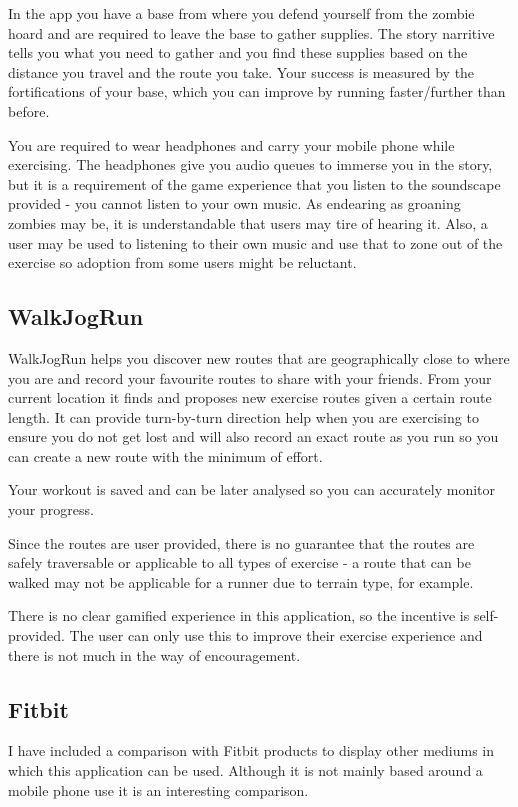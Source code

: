 In the app you have a base from where you defend yourself from the
zombie hoard and are required to leave the base to gather
supplies. The story narritive tells you what you need to gather and
you find these supplies based on the distance you travel and the route
you take. Your success is measured by the fortifications of your base,
which you can improve by running faster/further than before.

You are required to wear headphones and carry your mobile phone while
exercising. The headphones give you audio queues to immerse you in the
story, but it is a requirement of the game experience that you listen
to the soundscape provided - you cannot listen to your own music. As
endearing as groaning zombies may be, it is understandable that users
may tire of hearing it. Also, a user may be used to listening to their
own music and use that to zone out of the exercise so adoption from
some users might be reluctant.


\subsection{WalkJogRun}
WalkJogRun helps you discover new routes that are geographically
close to where you are and record your favourite routes to share with
your friends. From your current location it finds and
proposes new exercise routes given a certain route length. It can
provide turn-by-turn direction help when you are exercising to ensure
you do not get lost and will also record an exact route as you run so
you can create a new route with the minimum of effort. 

Your workout is saved and can be later analysed so you can accurately
monitor your progress.

Since the routes are user provided, there is no guarantee that the
routes are safely traversable or applicable to all types of exercise -
a route that can be walked may not be applicable for a runner due to
terrain type, for example. 

There is no clear gamified experience in this application, so the
incentive is self-provided. The user can only use this to improve
their exercise experience and there is not much in the way of encouragement.

\subsection{Fitbit}
I have included a comparison with Fitbit products to display other
mediums in which this application can be used. Although it is not
mainly based around a mobile phone use it is an interesting comparison.

